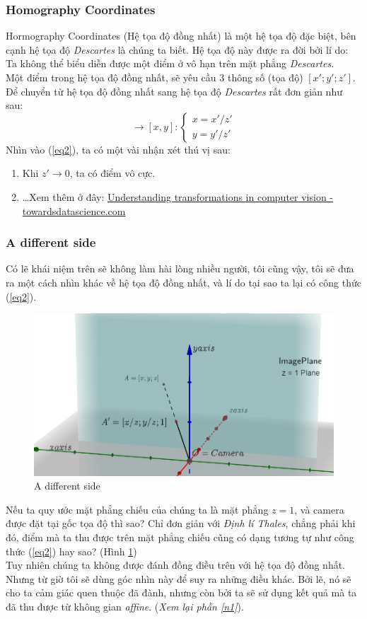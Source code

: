 \documentclass{article}
\begin{document}
\subsubsection{Homography Coordinates}
Hormography Coordinates (Hệ tọa độ đồng nhất) là một hệ tọa độ đặc biệt, bên cạnh hệ tọa độ \textit{Descartes} là chúng ta biết. Hệ tọa độ này được ra đời bởi lí do: Ta không thể biểu diễn được một điểm ở vô hạn trên mặt phẳng \textit{Descartes}.\\
Một điểm trong hệ tọa độ đồng nhất, sẽ yêu cầu 3 thông số (tọa độ) $[x';y';z']$. Để chuyển từ hệ tọa độ đồng nhất sang hệ tọa độ \textit{Descartes} rất đơn giản như sau:
\begin{equation}
    [x';y';z'] \rightarrow [x,y]: \begin{cases}
        x = x'/z'\\y=y'/z'
    \end{cases}
    \label{eq2}
\end{equation}
Nhìn vào (\ref{eq2}), ta có một vài nhận xét thú vị sau:
\begin{enumerate}
    \item Khi $z' \rightarrow 0$, ta có điểm vô cực.
    \item \ldots Xem thêm ở đây: \href{https://towardsdatascience.com/understanding-transformations-in-computer-vision-b001f49a9e61}{Understanding transformations in computer vision - towardsdatascience.com}
\end{enumerate}
\subsubsection*{A different side}
Có lẽ khái niệm trên sẽ không làm hài lòng nhiều người, tôi cũng vậy, tôi sẽ đưa ra một cách nhìn khác về hệ tọa độ đồng nhất, và lí do tại sao ta lại có công thức (\ref{eq2}). \\
\begin{figure}[ht!]
    \centering
    \includegraphics[width = 0.8\linewidth]{fig6.png}
    \caption{A different side}
    \label{fig6}
\end{figure}
Nếu ta quy ước mặt phẳng chiếu của chúng ta là mặt phẳng $z = 1$, và camera được đặt tại gốc tọa độ thì sao? Chỉ đơn giản với \textit{Định lí Thales}, chẳng phải khi đó, điểm mà ta thu được trên mặt phẳng chiếu cũng có dạng tương tự như công thức (\ref{eq2}) hay sao?  (Hình \ref{fig6})\\
Tuy nhiên chúng ta không được đánh đồng điều trên với hệ tọa độ đồng nhất. Nhưng từ giờ tôi sẽ dùng góc nhìn này để suy ra những điều khác. Bởi lẽ, nó sẽ cho ta cảm giác quen thuộc đã đành, nhưng còn bởi ta sẽ sử dụng kết quả mà ta đã thu được từ không gian \textit{affine}. (\textit{Xem lại phần \ref{n1}}).
\end{document}
